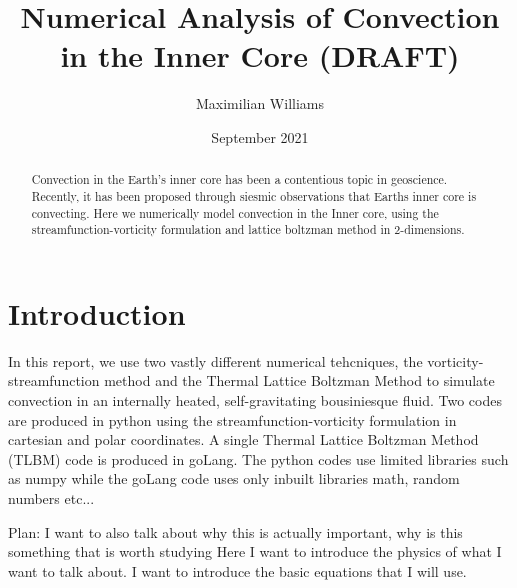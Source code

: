 \documentclass{article}
\title{Numerical Analysis of Convection in the Inner Core (DRAFT)}
\author{Maximilian Williams}
\date{September 2021}
\begin{document}
\maketitle

\begin{abstract}
	Convection in the Earth's inner core has been a contentious topic in geoscience. Recently, it has been proposed through siesmic observations that Earths inner core is convecting. Here we numerically model convection in the Inner core, using the streamfunction-vorticity formulation and lattice boltzman method in 2-dimensions. 
	
 
\end{abstract}

\section*{Introduction}
In this report, we use two vastly different numerical tehcniques, the vorticity-streamfunction method and the Thermal Lattice Boltzman Method to simulate convection in an internally heated, self-gravitating bousiniesque fluid. Two codes are produced in python using the streamfunction-vorticity formulation in cartesian and polar coordinates. A single Thermal Lattice Boltzman Method (TLBM) code is produced in goLang. The python codes use limited libraries such as numpy while the goLang code uses only inbuilt libraries math, random numbers etc... 

Plan:
I want to also talk about why this is actually important, why is this something that is worth studying
\newline
Here I want to introduce the physics of what I want to talk about. I want to introduce 
the basic equations that I will use.
\newline
\end{document}

